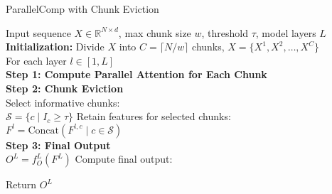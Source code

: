 \begin{algorithm}[H]
\caption{ParallelComp with Chunk Eviction}
\label{alg:parallelcomp}
Input sequence $X \in \mathbb{R}^{N \times d}$, max chunk size $w$, threshold $\tau$, model layers $L$\\


\textbf{Initialization:} Divide $X$ into $C = \lceil N / w \rceil$ chunks, $X = \{X^1, X^2, \dots, X^C\}$\;\\

For each layer $l \in [1, L]${ \\
    \textbf{Step 1: Compute Parallel Attention for Each Chunk}\;
    \\
    \textbf{Step 2: Chunk Eviction}\; \\
    Select informative chunks: \\
    $\mathcal{S} = \{c \mid I_c \geq \tau\}$\;
    Retain features for selected chunks: \\
    $F^l = \text{Concat}(F^{l,c} \mid c \in \mathcal{S})$\; \\
}
\textbf{Step 3: Final Output}\; \\

$O^L = f_O^L(F^L)$\;  Compute final output: 

Return $O^L$\;
\end{algorithm}

